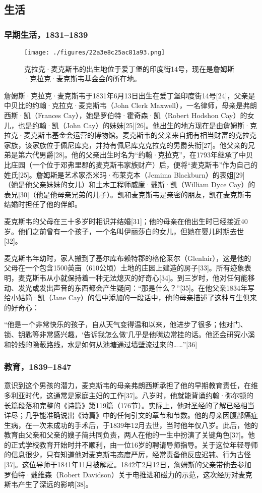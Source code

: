 \subsection{生活}  
\subsubsection{早期生活，1831–1839}
\begin{figure}[ht]
\centering
\texttt{[image: ./figures/22a3e8c25ac81a93.png]}
\caption{克拉克·麦克斯韦的出生地位于爱丁堡的印度街14号，现在是詹姆斯·克拉克·麦克斯韦基金会的所在地。} \label{fig_Clerk_7}
\end{figure}
詹姆斯·克拉克·麦克斯韦于1831年6月13日出生在爱丁堡印度街14号[24]，父亲是中贝比的约翰·克拉克·麦克斯韦（John Clerk Maxwell），一名律师，母亲是弗朗西斯·凯（Frances Cay），她是罗伯特·霍奇森·凯（Robert Hodshon Cay）的女儿，也是约翰·凯（John Cay）的妹妹[25][26]。他出生的地方现在是由詹姆斯·克拉克·麦克斯韦基金会运营的博物馆。麦克斯韦的父亲来自拥有相当财富的克拉克家族，该家族位于佩尼库克，并持有佩尼库克克拉克的男爵头衔[27]。他父亲的兄弟是第六代男爵[28]。他的父亲出生时名为“约翰·克拉克”，在1793年继承了中贝比庄园（一个位于邓弗里郡的麦克斯韦家族财产）后，便将“麦克斯韦”作为自己的姓氏[25]。詹姆斯是艺术家杰米玛·布莱克本（Jemima Blackburn）的表姐[29]（她是他父亲妹妹的女儿）和土木工程师威廉·戴斯·凯（William Dyce Cay）的表兄[30]（他是他母亲兄弟的儿子）。凯和麦克斯韦是亲密的朋友，凯在麦克斯韦结婚时担任了他的伴郎。

麦克斯韦的父母在三十多岁时相识并结婚[31]；他的母亲在他出生时已经接近40岁。他们之前曾有一个孩子，一个名叫伊丽莎白的女儿，但她在婴儿时期去世[32]。

麦克斯韦年幼时，家人搬到了基尔库布赖特郡的格伦莱尔（Glenlair），这是他的父母在一个包含1500英亩（610公顷）土地的庄园上建造的房子[33]。所有迹象表明，麦克斯韦从小就保持着一种无法熄灭的好奇心[34]。到三岁时，他对任何能移动、发光或发出声音的东西都会产生疑问：“那是什么？”[35]。在他父亲1834年写给小姑简·凯（Jane Cay）的信中添加的一段话中，他的母亲描述了这种与生俱来的好奇心：

“他是一个非常快乐的孩子，自从天气变得温和以来，他进步了很多；他对门、锁、钥匙等非常感兴趣，‘告诉我怎么做’几乎是他嘴边常挂的话。他还会研究小溪和铃线的隐蔽路线，水是如何从池塘通过墙壁流过来的……”[36]
\subsubsection{教育，1839–1847}  
意识到这个男孩的潜力，麦克斯韦的母亲弗朗西斯承担了他的早期教育责任，在维多利亚时代，这通常是家庭主妇的工作[37]。八岁时，他就能背诵约翰·弥尔顿的长篇段落和完整的《诗篇》第119篇（176节）。实际上，他对圣经的了解已经相当详尽；几乎能准确说出《诗篇》中的任何引文的章节和节数。他的母亲因腹部癌症生病，在一次未成功的手术后，于1839年12月去世，当时他年仅八岁。此后，他的教育由父亲和父亲的嫂子简共同负责，两人在他的一生中扮演了关键角色[37]。他的正式学校教育开始时并不顺利，由一位16岁的聘请导师指导。关于这位年轻导师的信息很少，只有知道他对麦克斯韦态度严厉，经常责备他反应迟钝、行为古怪[37]。这位导师于1841年11月被解雇。1842年2月12日，詹姆斯的父亲带他去参加罗伯特·戴维森（Robert Davidson）关于电推进和磁力的示范，这次经历对麦克斯韦产生了深远的影响[38]。

